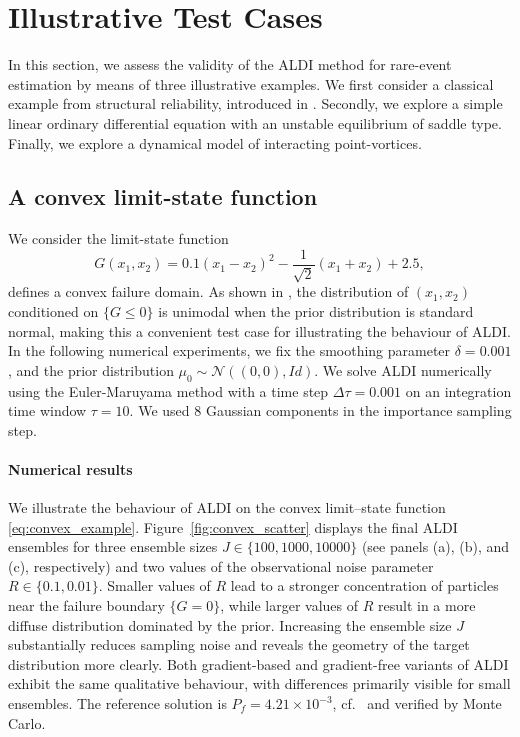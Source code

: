 \documentclass[a4paper]{article}
\numberwithin{equation}{section}
\begin{document}
\section{Illustrative Test Cases}
\label{SEC:numerics}

In this section, we assess the validity of the ALDI method for rare-event estimation by means of three illustrative examples. We first consider a classical example from structural reliability, introduced in
\cite{Katsuki94}. Secondly, we explore a simple linear ordinary differential equation with an unstable equilibrium of saddle type. Finally, we explore a dynamical model of interacting point-vortices.



\subsection{A convex limit-state function}
\label{SUBSEC:convex}
We consider the limit-state function
\begin{equation}
    \label{eq:convex_example}
    G(x_1,x_2)
    = 0.1 (x_1 - x_2)^2 - \frac{1}{\sqrt{2}}(x_1 + x_2) + 2.5,
\end{equation}
defines a convex failure domain.  As shown in \cite{Pappaioannou16}, the
distribution of $(x_1,x_2)$ conditioned on $\{G \le 0\}$ is unimodal {when the prior distribution is standard normal}, making this
a convenient test case for illustrating the behaviour of ALDI. In the following numerical experiments, we fix the smoothing parameter $\delta=0.001$, and the prior distribution $\mu_0\sim \mathcal{N}\left((0,0), Id \right)$. We solve ALDI numerically using the Euler-Maruyama method with a time step $\Delta \tau=0.001$ on an integration time window $\tau=10$. We used $8$ Gaussian components in the importance sampling step.


\paragraph{Numerical results}
We illustrate the behaviour of ALDI on the convex limit--state function
\eqref{eq:convex_example}. Figure~\ref{fig:convex_scatter} displays the final ALDI ensembles for three
ensemble sizes $J\in\{100,1000,10000\}$ (see panels (a), (b), and (c), respectively) and two values of the observational noise
parameter $R\in\{0.1,0.01\}$.
Smaller values of $R$ lead to a stronger concentration of particles near the
failure boundary $\{G=0\}$, while larger values of $R$ result in a more diffuse
distribution dominated by the prior.
Increasing the ensemble size $J$ substantially reduces sampling noise and
reveals the geometry of the target distribution more clearly.
Both gradient-based and gradient-free variants of ALDI exhibit the same
qualitative behaviour, with differences primarily visible for small ensembles. The reference solution is $P_f=4.21\times 10^{-3}$, cf.~\cite{Pappaioannou16} and verified by Monte Carlo.
\end{document}
